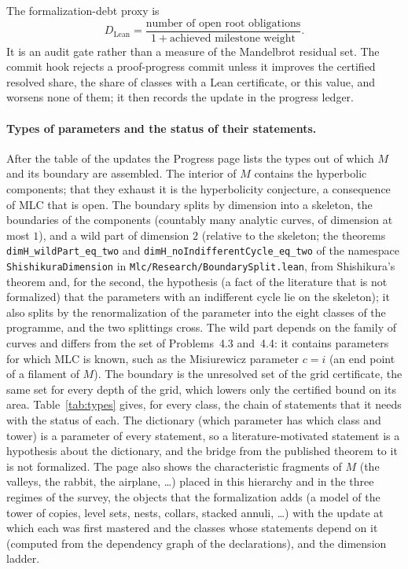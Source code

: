 \documentclass[11pt,a4paper]{article}
\begin{document}
The formalization-debt proxy is
\[
  D_{\mathrm{Lean}}
  =
  \frac{\text{number of open root obligations}}
       {1+\text{achieved milestone weight}}.
\]
It is an audit gate rather than a measure of the Mandelbrot residual set.
The commit hook rejects a proof-progress commit unless it improves the certified
resolved share, the share of classes with a Lean certificate, or this value, and
worsens none of them; it then records the update in the progress ledger.

\begin{table}[ht]
  \centering\footnotesize
  
  \caption{Route-planning priors. Ranges and priors are planning estimates.}
  \label{tab:routes}
\end{table}

\paragraph{Types of parameters and the status of their statements.}
After the table of the updates the Progress page lists the types out of which \(M\) and its
boundary are assembled. The interior of \(M\) contains the hyperbolic components; that they exhaust
it is the hyperbolicity conjecture, a consequence of MLC that is open. The boundary splits by
dimension into a skeleton, the boundaries of the components (countably many analytic curves, of
dimension at most \(1\)), and a wild part of dimension \(2\) (relative to the skeleton; the
theorems \texttt{dimH\_wildPart\_eq\_two} and \texttt{dimH\_noIndifferentCycle\_eq\_two} of the
namespace \texttt{ShishikuraDimension} in
\texttt{Mlc/Research/BoundarySplit.lean}, from Shishikura's theorem and, for the second, the
hypothesis (a fact of the literature that is not formalized) that the parameters with an
indifferent cycle lie on the skeleton); it also splits by the renormalization of
the parameter into the eight classes of the programme, and the two splittings cross. The wild part
depends on the family of curves and differs from the set of Problems~4.3 and~4.4: it contains
parameters for which MLC is known, such as the Misiurewicz parameter \(c=i\) (an end point of a
filament of \(M\)). The boundary is the unresolved set of the grid certificate, the same
set for every depth of the grid, which lowers only the certified bound on its area.
Table~\ref{tab:types} gives, for every class, the chain of statements that it needs with the
status of each. The dictionary (which parameter has which class and tower) is a parameter of every
statement, so a literature-motivated statement is a hypothesis about the dictionary, and the bridge
from the published theorem to it is not formalized. The page also shows the characteristic
fragments of
\(M\) (the valleys, the rabbit, the airplane, \dots) placed in this hierarchy and in the three
regimes of the survey, the objects that the formalization adds (a model of the tower of copies,
level sets, nests, collars, stacked annuli, \dots) with the update at which each was first
mastered and the classes whose statements depend on it (computed from the dependency graph of the
declarations), and the dimension ladder.
\end{document}
